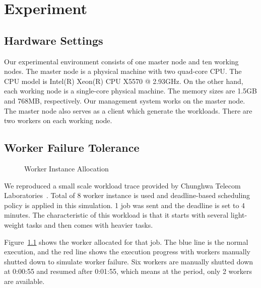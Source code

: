 \chapter{Experiment}\label{sec:exp}

\section{Hardware Settings}

Our experimental environment consists of one master node and ten working nodes.
The master node is a physical machine with two quad-core CPU.
The CPU model is Intel(R) Xeon(R) CPU X5570 @ 2.93GHz.
On the other hand, each working node is a single-core physical machine.
The memory sizes are 1.5GB and 768MB, respectively.
Our management system works on the master node.
The master node also serves as a client which generate the workloads.
There are two workers on each working node.

\section{Worker Failure Tolerance}

\begin{figure}
  \caption{Worker Instance Allocation}
  \label{figure:worker-failure}
\end{figure}

We reproduced a small scale workload trace provided by Chunghwa Telecom
Laboratories~\cite{cite:cht-lab}.
Total of 8 worker instance is used and deadline-based scheduling policy
is applied in this simulation. 
1 job was sent and the deadline is set to 4 minutes.
The characteristic of this workload is that it starts with several
light-weight tasks and then comes with heavier tasks.

Figure~\ref{figure:worker-failure} shows the worker allocated for that
job.
The blue line is the normal execution, and the red line shows the
execution progress with workers manually shutted down to simulate worker
failure.
Six workers are manually shutted down at 0:00:55 and resumed after
0:01:55, which means at the period, only 2 workers are available.

